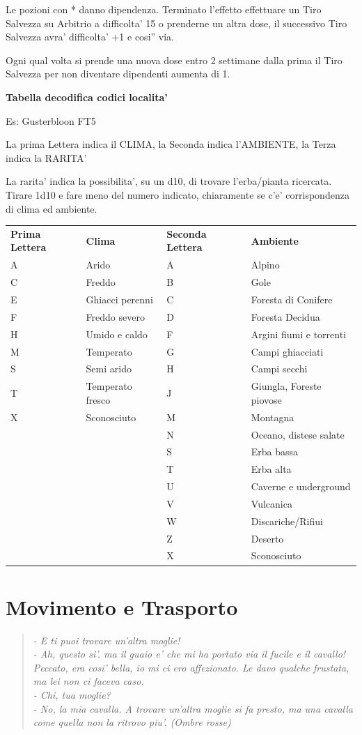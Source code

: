 \documentclass[a4paper,11pt,twoside,openany]{book}
\begin{document}
{\medskip

Le pozioni con {*} danno dipendenza. Terminato l'effetto effettuare
un Tiro Salvezza su Arbitrio a difficolta' 15 o prenderne un altra
dose, il successivo Tiro Salvezza avra' difficolta' +1 e cosi'' via.

Ogni qual volta si prende una nuova dose entro 2 settimane dalla prima
il Tiro Salvezza per non diventare dipendenti aumenta di 1.

\bigskip

\textbf{Tabella decodifica codici localita'}
\smallskip

Es: Gusterbloon FT5

La prima Lettera indica il CLIMA, la Seconda indica l'AMBIENTE, la
Terza indica la RARITA'

La rarita' indica la possibilita', su un d10, di trovare l'erba/pianta
ricercata. Tirare 1d10 e fare meno del numero indicato, chiaramente
se c'e' corrispondenza di clima ed ambiente.
\bigskip

\begin{tabular}{llll}
\toprule
\textbf{Prima Lettera} & \textbf{Clima}&\textbf{Seconda Lettera} & \textbf{Ambiente}\tabularnewline
A & Arido & A & Alpino\tabularnewline
C & Freddo&B & Gole\tabularnewline
E & Ghiacci perenni&C & Foresta di Conifere\tabularnewline
F & Freddo severo&D & Foresta Decidua\tabularnewline
H & Umido e caldo&F & Argini fiumi e torrenti\tabularnewline
M & Temperato&G & Campi ghiacciati\tabularnewline
S & Semi arido&H & Campi secchi\tabularnewline
T & Temperato fresco&J & Giungla, Foreste piovose\tabularnewline
X & Sconosciuto&M & Montagna\tabularnewline
&&N & Oceano, distese salate\tabularnewline
&&S & Erba bassa\tabularnewline
&&T & Erba alta\tabularnewline
&&U & Caverne e underground\tabularnewline
&&V & Vulcanica\tabularnewline
&&W & Discariche/Rifiui\tabularnewline
&&Z & Deserto\tabularnewline
&&X & Sconosciuto\tabularnewline
\end{tabular}

\pagebreak

\section{Movimento e Trasporto}

\label{movimento-e-trasporto}



\begin{quote}\textit{
- E ti puoi trovare un'altra moglie!\\
- Ah, questo si'. ma il guaio e' che mi ha portato via il fucile e il cavallo! Peccato, era cosi' bella, io mi ci ero affezionato. Le davo qualche frustata, ma lei non ci faceva caso.\\
- Chi, tua moglie?\\
- No, la mia cavalla. A trovare un'altra moglie si fa presto, ma una cavalla come quella non la ritrovo piu'. (Ombre rosse)
}\end{quote}


}
\end{document}
